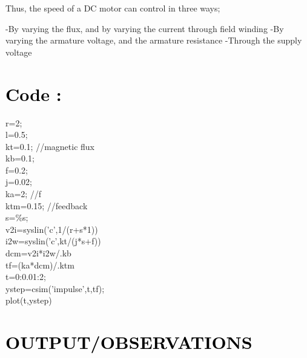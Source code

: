 \documentclass[12pt]{article}
\begin{document}
Thus, the speed of a DC motor can control in three ways;

-By varying the flux, and by varying the current through field winding
-By varying the armature voltage, and the armature resistance
-Through the supply voltage   
 \par

\section*{\textcolor{black}{Code :}}

  r=2;\\
l=0.5;\\
kt=0.1;   //magnetic flux\\
kb=0.1;\\
f=0.2;\\
j=0.02;\\
ka=2;       //f\\
ktm=0.15;  //feedback\\
 
s=\%s;\\
v2i=syslin('c',1/(r+s*1))\\
i2w=syslin('c',kt/(j*s+f))\\

dcm=v2i*i2w/.kb\\
tf=(ka*dcm)/.ktm\\
t=0:0.01:2;\\
ystep=csim('impulse',t,tf);\\

plot(t,ystep) \\\par 

\section*{\textcolor{black}{OUTPUT/OBSERVATIONS}}
\end{document}
